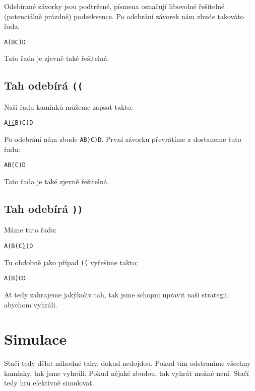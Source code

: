 \documentclass{article}
\newcommand{\bredl}{{\color{Maroon}(}}
\newcommand{\bredr}{{\color{Maroon})}}
\begin{document}
Odebírané závorky jsou podtržené, písmena označují libovolné řešitelné (potenciálně prázdné) podsekvence. Po odebrání závorek nám zbude takováto řada:

\begin{center}
    \texttt{{A}\bredl{B}{C}\bredr{D}}
\end{center}

Tato řada je zjevně také řešitelná.

\subsection[Tah odebírá ((]{Tah odebírá \texttt{\bredl\bredl}}

Naši řadu kamínků můžeme zapsat takto:

\begin{center}
    \texttt{{A}\underline{\bredl\bredl}{B}\bredr{C}\bredr{D}}
\end{center}

Po odebrání nám zbude \texttt{{A}{B}\bredr{C}\bredr{D}}. První závorku převrátíme a dostaneme tuto řadu:

\begin{center}
    \texttt{{A}{B}\bredl{C}\bredr{D}}
\end{center}

Tato řada je také zjevně řešitelná.

\subsection[Tah odebírá ))]{Tah odebírá \texttt{\bredr\bredr}}

Máme tuto řadu:

\begin{center}
    \texttt{{A}\bredl{B}\bredl{C}\underline{\bredr\bredr}{D}}
\end{center}

Tu obdobně jako případ \texttt{\bredl\bredl} vyřešíme takto:

\begin{center}
    \texttt{{A}\bredl{B}\bredr{C}{D}}
\end{center}

Ať tedy zahrajeme jakýkoliv tah, tak jsme schopni upravit naši strategii, abychom vyhráli.

\section{Simulace}

Stačí tedy dělat náhodné tahy, dokud nedojdou. Pokud tím odstraníme všechny kamínky, tak jsme vyhráli. Pokud nějaké zbudou, tak vyhrát možné není. Stačí tedy hru efektivně simulovat.
\end{document}

